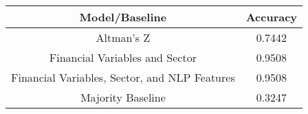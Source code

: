 \footnotesize
\begin{tabular}{cc}
\toprule
Model/Baseline & Accuracy \\
\midrule
Altman's Z & 0.7442 \\
Financial Variables and Sector & 0.9508 \\
Financial Variables, Sector, and NLP Features & 0.9508 \\
Majority Baseline & 0.3247 \\
\bottomrule
\end{tabular}

\normalsize